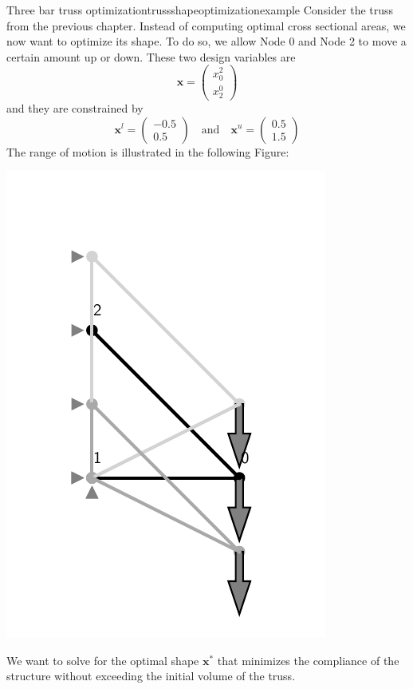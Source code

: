 \begin{example}{Three bar truss optimization}{trussshapeoptimizationexample}
    Consider the truss from the previous chapter. Instead of computing optimal cross sectional areas, we now want to optimize its shape. To do so, we allow Node 0 and Node 2 to move a certain amount up or down. These two design variables are 
    \begin{equation}
        \mathbf{x} = 
        \begin{pmatrix}
            x_0^2 \\ x_2^0
        \end{pmatrix}
    \end{equation}
    and they are constrained by 
    \begin{equation}
        \mathbf{x}^l = 
        \begin{pmatrix}
             -0.5\\ 0.5
        \end{pmatrix} 
        \quad 
        \text{and}
        \quad
        \mathbf{x}^u = 
        \begin{pmatrix}
             0.5\\ 1.5
        \end{pmatrix} 
    \end{equation}
    The range of motion is illustrated in the following Figure:
    \begin{center}
        \includegraphics[width=0.5\linewidth]{figures/three_bar_truss_shapes.pdf}
    \end{center}

    We want to solve for the optimal shape $\mathbf{x}^*$ that minimizes the compliance of the structure without exceeding the initial volume of the truss.


\end{example}
